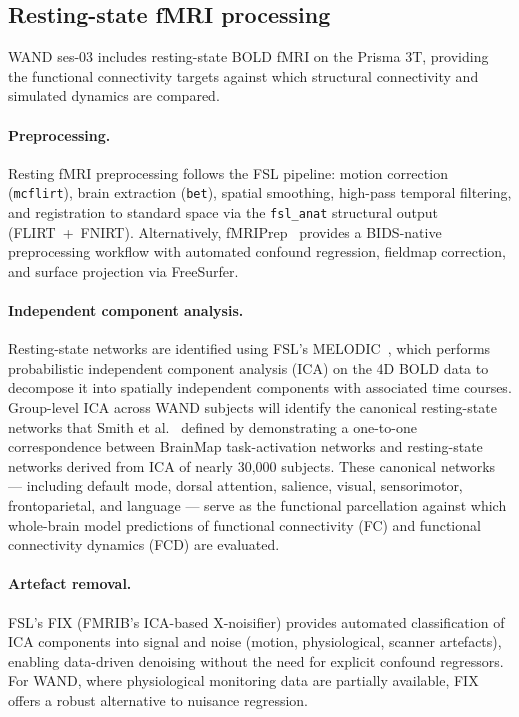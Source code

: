 \documentclass[11pt,a4paper]{article}\usepackage[]{graphicx}\usepackage[]{xcolor}
\begin{document}
\subsection{Resting-state fMRI processing}

WAND ses-03 includes resting-state BOLD fMRI on the Prisma 3T,
providing the functional connectivity targets against which structural
connectivity and simulated dynamics are compared.

\paragraph{Preprocessing.}
Resting fMRI preprocessing follows the FSL pipeline: motion correction
(\texttt{mcflirt}), brain extraction (\texttt{bet}), spatial smoothing,
high-pass temporal filtering, and registration to standard space via
the \texttt{fsl\_anat} structural output (FLIRT~+~FNIRT). Alternatively,
fMRIPrep~\citep{Esteban2019fmriprep} provides a BIDS-native
preprocessing workflow with automated confound regression, fieldmap
correction, and surface projection via FreeSurfer.

\paragraph{Independent component analysis.}
Resting-state networks are identified using FSL's
MELODIC~\citep{Beckmann2004melodic}, which performs probabilistic
independent component analysis (ICA) on the 4D BOLD data to decompose
it into spatially independent components with associated time courses.
Group-level ICA across WAND subjects will identify the canonical
resting-state networks that Smith et
al.~\citep{Smith2009correspondence} defined by demonstrating a
one-to-one correspondence between BrainMap task-activation networks
and resting-state networks derived from ICA of nearly 30,000 subjects.
These canonical networks --- including default mode, dorsal attention,
salience, visual, sensorimotor, frontoparietal, and language --- serve
as the functional parcellation against which whole-brain model
predictions of functional connectivity (FC) and functional connectivity
dynamics (FCD) are evaluated.

\paragraph{Artefact removal.}
FSL's FIX (FMRIB's ICA-based X-noisifier) provides automated
classification of ICA components into signal and noise (motion,
physiological, scanner artefacts), enabling data-driven denoising
without the need for explicit confound regressors. For WAND, where
physiological monitoring data are partially available, FIX offers a
robust alternative to nuisance regression.
\end{document}
